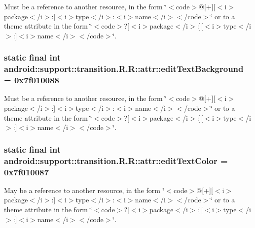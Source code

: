 Must be a reference to another resource, in the form \char`\"{}$<$code$>$@\mbox{[}+\mbox{]}\mbox{[}$<$i$>$package$<$/i$>$:\mbox{]}$<$i$>$type$<$/i$>$:$<$i$>$name$<$/i$>$$<$/code$>$\char`\"{} or to a theme attribute in the form \char`\"{}$<$code$>$?\mbox{[}$<$i$>$package$<$/i$>$:\mbox{]}\mbox{[}$<$i$>$type$<$/i$>$:\mbox{]}$<$i$>$name$<$/i$>$$<$/code$>$\char`\"{}. \hypertarget{classandroid_1_1support_1_1transition_1_1_r_1_1attr_955a45a2f0ab5cde44fa9da1e7765270}{
\subsubsection[{editTextBackground}]{\setlength{\rightskip}{0pt plus 5cm}static final int android::support::transition.R.R::attr::editTextBackground = 0x7f010088}}
\label{classandroid_1_1support_1_1transition_1_1_r_1_1attr_955a45a2f0ab5cde44fa9da1e7765270}


Must be a reference to another resource, in the form \char`\"{}$<$code$>$@\mbox{[}+\mbox{]}\mbox{[}$<$i$>$package$<$/i$>$:\mbox{]}$<$i$>$type$<$/i$>$:$<$i$>$name$<$/i$>$$<$/code$>$\char`\"{} or to a theme attribute in the form \char`\"{}$<$code$>$?\mbox{[}$<$i$>$package$<$/i$>$:\mbox{]}\mbox{[}$<$i$>$type$<$/i$>$:\mbox{]}$<$i$>$name$<$/i$>$$<$/code$>$\char`\"{}. \hypertarget{classandroid_1_1support_1_1transition_1_1_r_1_1attr_724bb8998d97912d27678787ddadc939}{
\subsubsection[{editTextColor}]{\setlength{\rightskip}{0pt plus 5cm}static final int android::support::transition.R.R::attr::editTextColor = 0x7f010087}}
\label{classandroid_1_1support_1_1transition_1_1_r_1_1attr_724bb8998d97912d27678787ddadc939}


May be a reference to another resource, in the form \char`\"{}$<$code$>$@\mbox{[}+\mbox{]}\mbox{[}$<$i$>$package$<$/i$>$:\mbox{]}$<$i$>$type$<$/i$>$:$<$i$>$name$<$/i$>$$<$/code$>$\char`\"{} or to a theme attribute in the form \char`\"{}$<$code$>$?\mbox{[}$<$i$>$package$<$/i$>$:\mbox{]}\mbox{[}$<$i$>$type$<$/i$>$:\mbox{]}$<$i$>$name$<$/i$>$$<$/code$>$\char`\"{}. 

